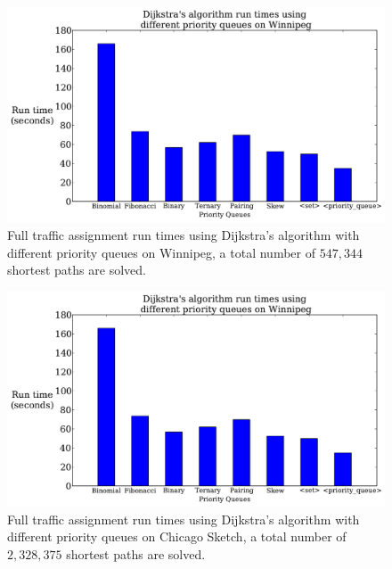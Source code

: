 \begin{figure}[!ht]
    \centering
    \includegraphics[page=1, width=\textwidth, height=.4\textheight]{img/pq_runtime}
    \caption{Full traffic assignment run times using Dijkstra's algorithm with different priority queues on Winnipeg, a total number of $547{,}344$ shortest paths are solved.}
    \label{fig:pq_runtime2}
\end{figure}
\begin{figure}[!ht]
    \centering
    \includegraphics[page=2, width=\textwidth, height=.4\textheight]{img/pq_runtime}
    \caption{Full traffic assignment run times using Dijkstra's algorithm with different priority queues on Chicago Sketch, a total number of $2{,}328{,}375$ shortest paths are solved.}
    \label{fig:pq_runtime}
\end{figure}

